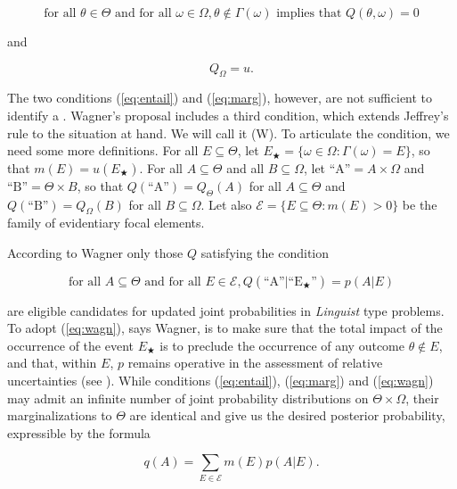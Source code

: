 \documentclass[phd,12pt,oneside]{ubcthesis}
\begin{document}
\begin{equation}
  \label{eq:entail}
  \mbox{for all }\theta\in\Theta\mbox{ and for all
  }\omega\in\Omega,\theta\notin\Gamma(\omega)\mbox{ implies that }Q(\theta,\omega)=0
\end{equation}

{\noindent}and

\begin{equation}
  \label{eq:marg}
  Q_{\Omega}=u.
\end{equation}

The two conditions (\ref{eq:entail}) and (\ref{eq:marg}), however, are
not sufficient to identify a  . Wagner's proposal includes a third
condition, which extends Jeffrey's rule to the situation at hand. We
will call it (W). To articulate the condition, we need some more
definitions. For all $E\subseteq{}\Theta$, let
$E_{\bigstar}=\{\omega\in\Omega:\Gamma(\omega)=E\}$, so that
$m(E)=u(E_{\bigstar})$. For all $A\subseteq\Theta$ and all
$B\subseteq\Omega$, let $\mbox{``A''}=A\times\Omega$ and
$\mbox{``B''}=\Theta\times{}B$, so that
$Q(\mbox{``A''})=Q_{\Theta}(A)$ for all $A\subseteq\Theta$ and
$Q(\mbox{``B''})=Q_{\Omega}(B)$ for all $B\subseteq\Omega$. Let also
$\mathcal{E}=\{E\subseteq\Theta:m(E)>0\}$ be the family of evidentiary
focal elements.

According to Wagner only those $Q$ satisfying the condition

\begin{equation}
  \label{eq:wagn}
  \mbox{for all }A\subseteq\Theta\mbox{ and for all }E\in\mathcal{E},Q(\mbox{``A''}|\mbox{``E$_{\bigstar}$''})=p(A|E)
\end{equation}

are eligible candidates for updated joint probabilities in
\emph{Linguist} type problems. 
To adopt (\ref{eq:wagn}), says Wagner, is to make sure
that the total impact of the occurrence of the event $E_{\bigstar}$ is
to preclude the occurrence of any outcome $\theta\notin{}E$, and that,
within $E$, $p$ remains operative in the assessment of relative
uncertainties (see ). While conditions
(\ref{eq:entail}), (\ref{eq:marg}) and (\ref{eq:wagn}) may admit an
infinite number of joint probability distributions on
$\Theta\times\Omega$, their marginalizations to $\Theta$ are identical
and give us the desired posterior probability, expressible by the
formula

\begin{equation}
  \label{eq:qofa}
  q(A)=\sum_{E\in\mathcal{E}}m(E)p(A|E).
\end{equation}
\end{document}
